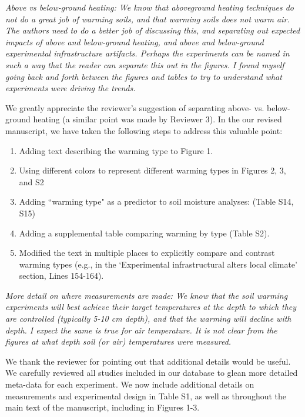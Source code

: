 \documentclass[11pt,a4paper]{letter}
\begin{document}
\begin{letter}{}
\par \emph{Above vs below-ground heating:  We know that aboveground heating techniques do not do a great job of warming soils, and that warming soils does not warm air. The authors need to do a better job of discussing this, and separating out expected impacts of above and below-ground heating, and above and below-ground experimental infrastructure artifacts.  Perhaps the experiments can be named in such a way that the reader can separate this out in the figures. I found myself going back and forth between the figures and tables to try to understand what experiments were driving the trends.} 
\par 
We greatly appreciate the reviewer's suggestion of separating above- vs. below-ground heating (a similar point was made by Reviewer 3). In the our revised manuscript, we have taken the following steps to address this valuable point:
\begin{enumerate}
\item Adding text describing the warming type to Figure 1.
\item Using different colors  to represent different warming types in Figures 2, 3, and S2
\item Adding ``warming type" as a predictor to soil moisture analyses: (Table S14, S15)
\item Adding a supplemental table comparing warming by type (Table S2).
\item Modified the text in multiple places to explicitly compare and contrast warming types (e.g., in the `Experimental infrastructural alters local climate' section, Lines 154-164). 
\end{enumerate}

\par \emph{More detail on where measurements are made:  We know that the soil warming experiments will best achieve their target temperatures at the depth to which they are controlled (typically 5-10 cm depth), and that the warming will decline with depth.  I expect the same is true for air temperature. It is not clear from the figures at what depth soil (or air) temperatures were measured.}
\par We thank the reviewer for pointing out that additional details would be useful. We carefully reviewed all studies included in our database to glean more detailed meta-data for each experiment. We now include additional details on measurements and experimental design in Table S1, as well as throughout the main text of the manuscript, including in Figures 1-3.


\end{letter}
\end{document}
